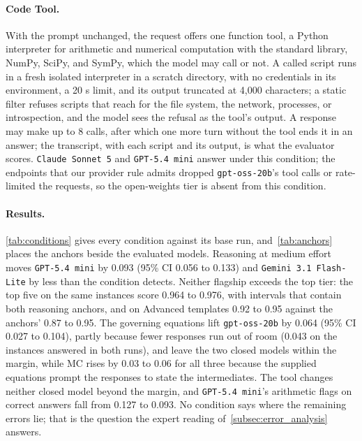 \paragraph{Code Tool.}
With the prompt unchanged, the request offers one function tool, a Python interpreter for arithmetic
and numerical computation with the standard library, NumPy, SciPy, and SymPy, which the model may
call or not.
A called script runs in a fresh isolated interpreter in a scratch directory, with no credentials in
its environment, a 20 s limit, and its output truncated at 4,000 characters; a static filter refuses
scripts that reach for the file system, the network, processes, or introspection, and the model sees
the refusal as the tool's output.
A response may make up to 8 calls, after which one more turn without the tool ends it in an answer;
the transcript, with each script and its output, is what the evaluator scores.
\texttt{Claude Sonnet 5} and \texttt{GPT-5.4 mini} answer under this condition; the endpoints that
our provider rule admits dropped \texttt{gpt-oss-20b}'s tool calls or rate-limited the requests, so
the open-weights tier is absent from this condition.

\paragraph{Results.}
\autoref{tab:conditions} gives every condition against its base run, and~\autoref{tab:anchors}
places the anchors beside the evaluated
models.
Reasoning at medium effort moves \texttt{GPT-5.4 mini} by 0.093 (95\% CI 0.056 to 0.133) and
\texttt{Gemini 3.1 Flash-Lite} by less than the condition detects.
Neither flagship exceeds the top tier: the top five on the same instances score 0.964 to 0.976, with
intervals that contain both reasoning anchors, and on Advanced templates 0.92 to 0.95 against the
anchors' 0.87 to 0.95.
The governing equations lift \texttt{gpt-oss-20b} by 0.064 (95\% CI 0.027 to 0.104), partly because
fewer responses run out of room (0.043 on the instances answered in both runs), and leave the two
closed models within the margin, while MC rises by 0.03 to 0.06 for all three because the supplied
equations prompt the responses to state the intermediates.
The tool changes neither closed model beyond the margin, and \texttt{GPT-5.4 mini}'s arithmetic
flags on correct answers fall from 0.127 to 0.093.
No condition says where the remaining errors lie; that is the question the expert reading
of~\autoref{subsec:error_analysis} answers.

